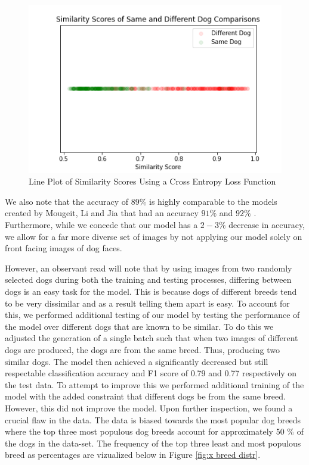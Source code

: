 \documentclass{article}
\begin{document}
\begin{figure}[h]
\centering
	\includegraphics[scale=0.7]{final-report-images/crossentropy_lineplot.png}
\caption{Line Plot of Similarity Scores Using a Cross Entropy Loss Function}
\label{fig:x triplet lineplot}
\end{figure}
\noident We also note that the accuracy of $89\%$ is highly comparable to the models created by Mougeit, Li and Jia that had an accuracy $91\%$ and $92\%$ \cite{MougeotGuillaume2019ADLA}.  Furthermore, while we concede that our model has a $2-3\%$ decrease in accuracy, we allow for a far more diverse set of images by not applying our model solely on front facing images of dog faces.

However, an observant read will note that by using images from two randomly selected dogs during both the training and testing processes, differing between dogs is an easy task for the model.  This is because dogs of different breeds tend to be very dissimilar and as a result telling them apart is easy.  To account for this, we performed additional testing of our model by testing the performance of the model over different dogs that are known to be similar.  To do this we adjusted the generation of a single batch such that when two images of different dogs are produced, the dogs are from the same breed.  Thus, producing two similar dogs.  The model then achieved a significantly decreased but still respectable classification accuracy and F1 score of 0.79 and 0.77 respectively on the test data.   To attempt to improve this we performed additional training of the model with the added constraint that different dogs be from the same breed.  However, this did not improve the model.  Upon further inspection, we found a crucial flaw in the data.  The data is biased towards the most popular dog breeds where the top three most populous dog breeds account for approximately 50 \% of the dogs in the data-set.  The frequency of the top three least and most populous breed as percentages are vizualized below in Figure \ref{fig:x breed distr}.
\end{document}
